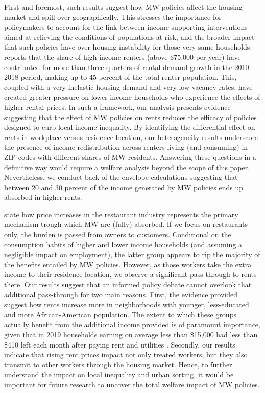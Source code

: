 First and foremost, such results suggest how MW policies affect the housing market and 
spill over geographically. This stresses the importance for policymakers to account for 
the link between income-supporting interventions aimed at relieving the conditions of 
populations at risk, and the broader impact that such policies have over housing 
instability for those very same households. \textcite{fernald2020americas} reports that 
the share of high-income renters (above \$75,000 per year) have contributed for more than 
three-quarters of rental demand growth in the 2010-2018 period, making up to 45 percent of 
the total renter population. This, coupled with a very inelastic housing demand and very low 
vacancy rates, have created greater pressure on lower-income households who experience the
effects of higher rental prices. 
In such a framework, our analysis presents evidence suggesting that the effect of MW policies 
on rents reduces the efficacy of policies designed to curb local income inequality. By 
identifying the differential effect on rents in workplace versus residence location, our
heterogeneity results underscore the presence of income redistribution across renters 
living (and consuming) in ZIP codes with different shares of MW residents. Answering these 
questions in a definitive way would require a welfare analysis beyond the scope of this paper. 
Nevertheless, we conduct back-of-the-envelope calculations suggesting that between 20 and 
30 percent of the income generated by MW policies ends up absorbed in higher rents.

\textcite{Allegretto2018} state how price increases in the restaurant industry represents 
the primary mechanism trough which MW are (fully) absorbed. If we focus on restaurants only, 
the burden is passed from owners to customers. Conditional on the consumption habits of higher 
and lower income households (and assuming a negligible impact on employment), the latter group 
appears to rip the majority of the benefits entailed by MW policies. However, as those workers
take the extra income to their residence location, we observe a significant pass-through to 
rents there. Our results suggest that an informed policy debate cannot overlook that additional 
pass-through for two main reasons. First, the evidence provided suggest how rents increase more 
in neighborhoods with younger, less-educated and more African-American population. The extent 
to which these groups actually benefit from the additional income provided is of paramount 
importance, given that in 2019 households earning on average less than \$15,000 had less than 
\$410 left each month after paying rent and utilities \parencite{fernald2020americas}. Secondly, 
our results indicate that rising rent prices impact not only treated workers, but they also
transmit to other workers through the housing market. Hence, to further understand the impact 
on local inequality and urban sorting, it would be important for future research to uncover the 
total welfare impact of MW policies. 

 